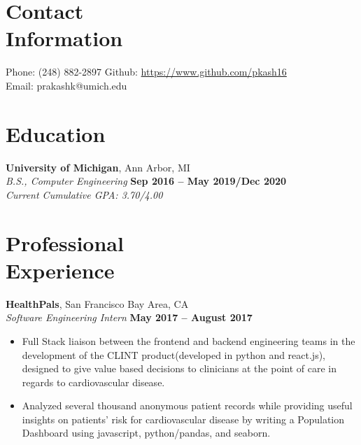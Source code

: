 \documentclass[margin,line]{resume}
\begin{document}
\begin{resume}
    \section{\mysidestyle Contact\\Information}

    Phone: (248) 882-2897       \hfill Github: \url{https://www.github.com/pkash16} \\
    \noindent Email: prakashk@umich.edu  \vspace{0mm}\\\vspace{-4.5mm}

    \section{\mysidestyle Education}

    \textbf{University of Michigan}, Ann Arbor, MI \vspace{2mm}\\\vspace{1mm}%
    \textsl{B.S., Computer Engineering} \hfill \textbf{Sep 2016 -- May 2019/Dec 2020}\\
   	\emph{Current Cumulative GPA: 3.70/4.00}

    \section{\mysidestyle Professional\\Experience}
    \textbf{HealthPals}, San Francisco Bay Area, CA \vspace{2mm}\\\vspace{1mm}%
    \textsl{Software Engineering Intern} \hfill \textbf{May 2017 -- August 2017}
    \begin{itemize}
    \item Full Stack liaison between the frontend and backend engineering teams in the development of the CLINT product(developed in python and react.js), designed to give value based decisions to clinicians at the point of care in regards to cardiovascular disease.
    \item Analyzed several thousand anonymous patient records while providing useful insights on patients' risk for cardiovascular disease by writing a Population Dashboard using javascript, python/pandas, and seaborn.
    \end{itemize}




\end{resume}
\end{document}
